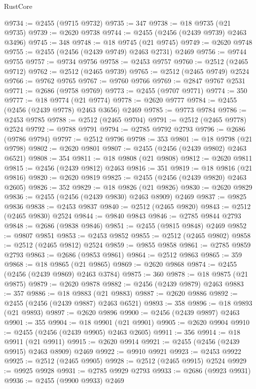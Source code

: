 \begin{lexlean}{RustCore}
\begin{coremodule}
@9734 := @2455 (@9715 @9732)
@9735 := 347
@9738 := @18 @9735 (@21 @9735)
@9739 := @2620 @9738
@9744 := @2455 (@2456 (@2439 @9739) @2463 @3496)
@9745 := 348
@9748 := @18 @9745 (@21 @9745)
@9749 := @2620 @9748
@9755 := @2455 (@2456 (@2439 @9749) @2463 @2731) @2469
@9756 := @9744 @9755
@9757 := @9734 @9756
@9758 := @2453 @9757
@9760 := @2512 (@2465 @9712)
@9762 := @2512 (@2465 @9739)
@9765 := @2512 (@2465 @9749) @2524
@9766 := @9762 @9765
@9767 := @9760 @9766
@9769 := @2847 @9767 @2531
@9771 := @2686 (@9758 @9769)
@9773 := @2455 (@9707 @9771)
@9774 := 350
@9777 := @18 @9774 (@21 @9774)
@9778 := @2620 @9777
@9784 := @2455 (@2456 (@2439 @9778) @2463 @3656) @2469
@9785 := @9773 @9784
@9786 := @2453 @9785
@9788 := @2512 (@2465 @9704)
@9791 := @2512 (@2465 @9778) @2524
@9792 := @9788 @9791
@9794 := @2785 @9792 @2793
@9796 := @2686 (@9786 @9794)
@9797 := @2512 @9796
@9798 := 353
@9801 := @18 @9798 (@21 @9798)
@9802 := @2620 @9801
@9807 := @2455 (@2456 (@2439 @9802) @2463 @6521)
@9808 := 354
@9811 := @18 @9808 (@21 @9808)
@9812 := @2620 @9811
@9815 := @2456 (@2439 @9812) @2463
@9816 := 351
@9819 := @18 @9816 (@21 @9816)
@9820 := @2620 @9819
@9825 := @2455 (@2456 (@2439 @9820) @2463 @2605)
@9826 := 352
@9829 := @18 @9826 (@21 @9826)
@9830 := @2620 @9829
@9836 := @2455 (@2456 (@2439 @9830) @2463 @8909) @2469
@9837 := @9825 @9836
@9838 := @2453 @9837
@9840 := @2512 (@2465 @9820)
@9843 := @2512 (@2465 @9830) @2524
@9844 := @9840 @9843
@9846 := @2785 @9844 @2793
@9848 := @2686 (@9838 @9846)
@9851 := @2455 (@9815 @9848) @2469
@9852 := @9807 @9851
@9853 := @2453 @9852
@9855 := @2512 (@2465 @9802)
@9858 := @2512 (@2465 @9812) @2524
@9859 := @9855 @9858
@9861 := @2785 @9859 @2793
@9863 := @2686 (@9853 @9861)
@9864 := @2512 @9863
@9865 := 359
@9868 := @18 @9865 (@21 @9865)
@9869 := @2620 @9868
@9874 := @2455 (@2456 (@2439 @9869) @2463 @3784)
@9875 := 360
@9878 := @18 @9875 (@21 @9875)
@9879 := @2620 @9878
@9882 := @2456 (@2439 @9879) @2463
@9883 := 357
@9886 := @18 @9883 (@21 @9883)
@9887 := @2620 @9886
@9892 := @2455 (@2456 (@2439 @9887) @2463 @6521)
@9893 := 358
@9896 := @18 @9893 (@21 @9893)
@9897 := @2620 @9896
@9900 := @2456 (@2439 @9897) @2463
@9901 := 355
@9904 := @18 @9901 (@21 @9901)
@9905 := @2620 @9904
@9910 := @2455 (@2456 (@2439 @9905) @2463 @2605)
@9911 := 356
@9914 := @18 @9911 (@21 @9911)
@9915 := @2620 @9914
@9921 := @2455 (@2456 (@2439 @9915) @2463 @8909) @2469
@9922 := @9910 @9921
@9923 := @2453 @9922
@9925 := @2512 (@2465 @9905)
@9928 := @2512 (@2465 @9915) @2524
@9929 := @9925 @9928
@9931 := @2785 @9929 @2793
@9933 := @2686 (@9923 @9931)
@9936 := @2455 (@9900 @9933) @2469

\end{coremodule}
\end{lexlean}
